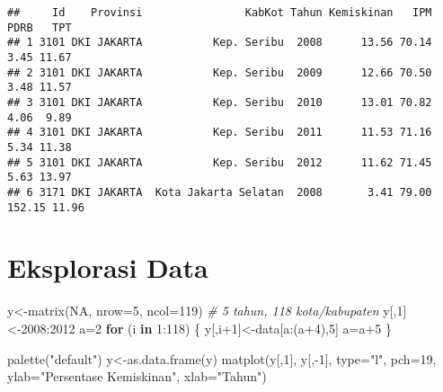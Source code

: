 \documentclass[
]{book}
\newenvironment{Shaded}{\begin{snugshade}}{\end{snugshade}}
\newcommand{\AttributeTok}[1]{\textcolor[rgb]{0.77,0.63,0.00}{#1}}
\newcommand{\CommentTok}[1]{\textcolor[rgb]{0.56,0.35,0.01}{\textit{#1}}}
\newcommand{\ConstantTok}[1]{\textcolor[rgb]{0.00,0.00,0.00}{#1}}
\newcommand{\ControlFlowTok}[1]{\textcolor[rgb]{0.13,0.29,0.53}{\textbf{#1}}}
\newcommand{\DecValTok}[1]{\textcolor[rgb]{0.00,0.00,0.81}{#1}}
\newcommand{\FunctionTok}[1]{\textcolor[rgb]{0.00,0.00,0.00}{#1}}
\newcommand{\NormalTok}[1]{#1}
\newcommand{\OtherTok}[1]{\textcolor[rgb]{0.56,0.35,0.01}{#1}}
\newcommand{\SpecialCharTok}[1]{\textcolor[rgb]{0.00,0.00,0.00}{#1}}
\newcommand{\StringTok}[1]{\textcolor[rgb]{0.31,0.60,0.02}{#1}}
\begin{document}
\begin{verbatim}
##     Id    Provinsi                KabKot Tahun Kemiskinan   IPM   PDRB   TPT
## 1 3101 DKI JAKARTA           Kep. Seribu  2008      13.56 70.14   3.45 11.67
## 2 3101 DKI JAKARTA           Kep. Seribu  2009      12.66 70.50   3.48 11.57
## 3 3101 DKI JAKARTA           Kep. Seribu  2010      13.01 70.82   4.06  9.89
## 4 3101 DKI JAKARTA           Kep. Seribu  2011      11.53 71.16   5.34 11.38
## 5 3101 DKI JAKARTA           Kep. Seribu  2012      11.62 71.45   5.63 13.97
## 6 3171 DKI JAKARTA  Kota Jakarta Selatan  2008       3.41 79.00 152.15 11.96
\end{verbatim}

\hypertarget{eksplorasi-data-2}{%
\section{Eksplorasi Data}\label{eksplorasi-data-2}}

\begin{Shaded}
\begin{Highlighting}[]
\NormalTok{y}\OtherTok{\textless{}{-}}\FunctionTok{matrix}\NormalTok{(}\ConstantTok{NA}\NormalTok{, }\AttributeTok{nrow=}\DecValTok{5}\NormalTok{, }\AttributeTok{ncol=}\DecValTok{119}\NormalTok{) }\CommentTok{\# 5 tahun, 118 kota/kabupaten}
\NormalTok{y[,}\DecValTok{1}\NormalTok{]}\OtherTok{\textless{}{-}}\DecValTok{2008}\SpecialCharTok{:}\DecValTok{2012}
\NormalTok{a}\OtherTok{=}\DecValTok{2}
\ControlFlowTok{for}\NormalTok{ (i }\ControlFlowTok{in} \DecValTok{1}\SpecialCharTok{:}\DecValTok{118}\NormalTok{)}
\NormalTok{\{}
\NormalTok{  y[,i}\SpecialCharTok{+}\DecValTok{1}\NormalTok{]}\OtherTok{\textless{}{-}}\NormalTok{data[a}\SpecialCharTok{:}\NormalTok{(a}\SpecialCharTok{+}\DecValTok{4}\NormalTok{),}\DecValTok{5}\NormalTok{]}
\NormalTok{  a}\OtherTok{=}\NormalTok{a}\SpecialCharTok{+}\DecValTok{5}
\NormalTok{\}}

\FunctionTok{palette}\NormalTok{(}\StringTok{"default"}\NormalTok{)}
\NormalTok{y}\OtherTok{\textless{}{-}}\FunctionTok{as.data.frame}\NormalTok{(y)}
\FunctionTok{matplot}\NormalTok{(y[,}\DecValTok{1}\NormalTok{], y[,}\SpecialCharTok{{-}}\DecValTok{1}\NormalTok{], }\AttributeTok{type=}\StringTok{"l"}\NormalTok{, }\AttributeTok{pch=}\DecValTok{19}\NormalTok{, }\AttributeTok{ylab=}\StringTok{"Persentase Kemiskinan"}\NormalTok{, }\AttributeTok{xlab=}\StringTok{"Tahun"}\NormalTok{)}
\end{Highlighting}
\end{Shaded}
\end{document}
